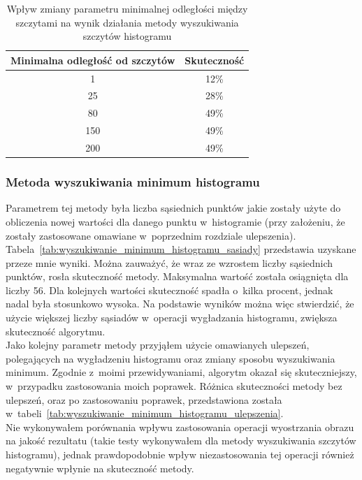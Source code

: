 \begin {table}
  \begin{center}
    \begin{tabular}{c | c}
      Minimalna odległość od szczytów & Skuteczność \\
      \hline
      1 & 12\% \\
      25 & 28\% \\
      80 & 49\% \\
      150 & 49\% \\
      200 & 49\%
    \end{tabular}
    \caption {Wpływ zmiany parametru minimalnej odległości między szczytami na wynik działania metody wyszukiwania szczytów histogramu}
    \label{tab:wyszukiwanie_szczytow_dystans} 
  \end{center}
\end {table}

\subsubsection{Metoda wyszukiwania minimum histogramu}
Parametrem tej metody była liczba sąsiednich punktów jakie zostały użyte do obliczenia nowej wartości dla danego punktu w~histogramie (przy założeniu, że zostały zastosowane omawiane w~poprzednim rozdziale ulepszenia). Tabela~\ref{tab:wyszukiwanie_minimum_histogramu_sasiady} przedstawia uzyskane przeze mnie wyniki. Można zauważyć, że wraz ze wzrostem liczby sąsiednich punktów, rosła skuteczność metody. Maksymalna wartość została osiągnięta dla liczby 56. Dla kolejnych wartości skuteczność spadła o~kilka procent, jednak nadal była stosunkowo wysoka. Na podstawie wyników można więc stwierdzić, że użycie większej liczby sąsiadów w~operacji wygładzania histogramu, zwiększa skuteczność algorytmu. \\
Jako kolejny parametr metody przyjąłem użycie omawianych ulepszeń, polegających na wygładzeniu histogramu oraz zmiany sposobu wyszukiwania minimum. Zgodnie z~moimi przewidywaniami, algorytm okazał się skuteczniejszy, w~przypadku zastosowania moich poprawek. Różnica skuteczności metody bez ulepszeń, oraz po zastosowaniu poprawek, przedstawiona została w~tabeli~\ref{tab:wyszukiwanie_minimum_histogramu_ulepszenia}. \\
Nie wykonywałem porównania wpływu zastosowania operacji wyostrzania obrazu na jakość rezultatu (takie testy wykonywałem dla metody wyszukiwania szczytów histogramu), jednak prawdopodobnie wpływ niezastosowania tej operacji również negatywnie wpłynie na skuteczność metody.


